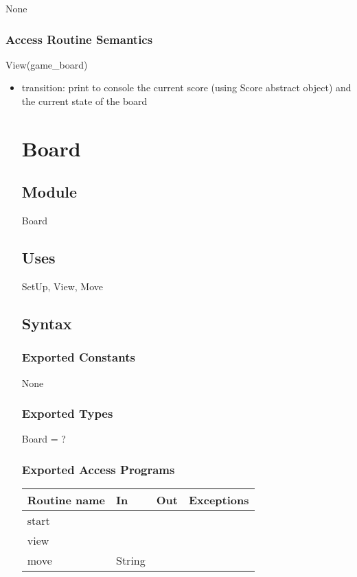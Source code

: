 \documentclass[12pt]{article}
\begin{document}
None

\subsubsection* {Access Routine Semantics}

\noindent View(game\_board)

\begin{itemize}
\item transition: print to console the current score (using Score abstract object) and the current state of the board

\newpage

\section* {Board}

\subsection*{Module}

Board

\subsection* {Uses}

SetUp, View, Move

\subsection* {Syntax}

\subsubsection* {Exported Constants}

None

\subsubsection* {Exported Types}

Board = ?

\subsubsection* {Exported Access Programs}

\begin{tabular}{| l | l | l | p{5cm} |}
  \hline
  \textbf{Routine name} & \textbf{In} & \textbf{Out} & \textbf{Exceptions}\\
  \hline
  start & & & & \\
  \hline
  view & & & \\
  \hline
  move & String & & \\
  \hline
  

\end{tabular}
\end{itemize}
\end{document}
